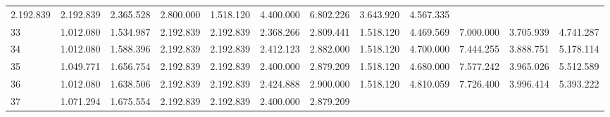 \begin{tabular}{llllllllllll}
  \multicolumn{1}{r}{2.192.839} &
  \multicolumn{1}{r}{2.192.839} &
  \multicolumn{1}{r}{2.365.528} &
  \multicolumn{1}{r}{2.800.000} &
  \multicolumn{1}{r}{1.518.120} &
  \multicolumn{1}{r}{4.400.000} &
  \multicolumn{1}{r}{6.802.226} &
  \multicolumn{1}{r}{3.643.920} &
  \multicolumn{1}{r}{4.567.335} \\
\multicolumn{1}{l}{\hspace{1em}33} &
  \multicolumn{1}{|r}{1.012.080} &
  \multicolumn{1}{r}{1.534.987} &
  \multicolumn{1}{r}{2.192.839} &
  \multicolumn{1}{r}{2.192.839} &
  \multicolumn{1}{r}{2.368.266} &
  \multicolumn{1}{r}{2.809.441} &
  \multicolumn{1}{r}{1.518.120} &
  \multicolumn{1}{r}{4.469.569} &
  \multicolumn{1}{r}{7.000.000} &
  \multicolumn{1}{r}{3.705.939} &
  \multicolumn{1}{r}{4.741.287} \\
\multicolumn{1}{l}{\hspace{1em}34} &
  \multicolumn{1}{|r}{1.012.080} &
  \multicolumn{1}{r}{1.588.396} &
  \multicolumn{1}{r}{2.192.839} &
  \multicolumn{1}{r}{2.192.839} &
  \multicolumn{1}{r}{2.412.123} &
  \multicolumn{1}{r}{2.882.000} &
  \multicolumn{1}{r}{1.518.120} &
  \multicolumn{1}{r}{4.700.000} &
  \multicolumn{1}{r}{7.444.255} &
  \multicolumn{1}{r}{3.888.751} &
  \multicolumn{1}{r}{5.178.114} \\
\multicolumn{1}{l}{\hspace{1em}35} &
  \multicolumn{1}{|r}{1.049.771} &
  \multicolumn{1}{r}{1.656.754} &
  \multicolumn{1}{r}{2.192.839} &
  \multicolumn{1}{r}{2.192.839} &
  \multicolumn{1}{r}{2.400.000} &
  \multicolumn{1}{r}{2.879.209} &
  \multicolumn{1}{r}{1.518.120} &
  \multicolumn{1}{r}{4.680.000} &
  \multicolumn{1}{r}{7.577.242} &
  \multicolumn{1}{r}{3.965.026} &
  \multicolumn{1}{r}{5.512.589} \\
\multicolumn{1}{l}{\hspace{1em}36} &
  \multicolumn{1}{|r}{1.012.080} &
  \multicolumn{1}{r}{1.638.506} &
  \multicolumn{1}{r}{2.192.839} &
  \multicolumn{1}{r}{2.192.839} &
  \multicolumn{1}{r}{2.424.888} &
  \multicolumn{1}{r}{2.900.000} &
  \multicolumn{1}{r}{1.518.120} &
  \multicolumn{1}{r}{4.810.059} &
  \multicolumn{1}{r}{7.726.400} &
  \multicolumn{1}{r}{3.996.414} &
  \multicolumn{1}{r}{5.393.222} \\
\multicolumn{1}{l}{\hspace{1em}37} &
  \multicolumn{1}{|r}{1.071.294} &
  \multicolumn{1}{r}{1.675.554} &
  \multicolumn{1}{r}{2.192.839} &
  \multicolumn{1}{r}{2.192.839} &
  \multicolumn{1}{r}{2.400.000} &
  \multicolumn{1}{r}{2.879.209} &

\end{tabular}
